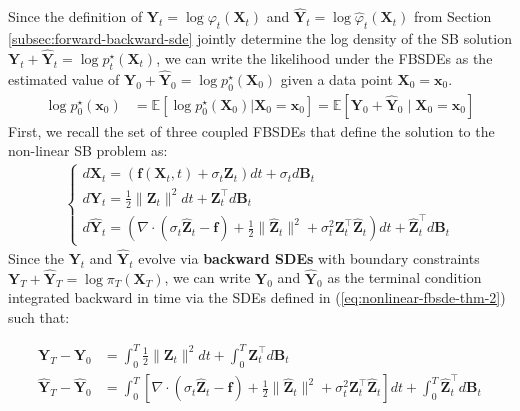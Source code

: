 \documentclass{article}
\begin{document}
Since the definition of $\boldsymbol{Y}_t=\log \varphi_t(\boldsymbol{X}_t)$ and $\widehat{\boldsymbol{Y}}_t=\log \hat{\varphi}_t(\boldsymbol{X}_t)$ from Section \ref{subsec:forward-backward-sde} jointly determine the log density of the SB solution $\boldsymbol{Y}_t+\widehat{\boldsymbol{Y}}_t=\log p^\star_t(\boldsymbol{X}_t)$, we can write the likelihood under the FBSDEs as the estimated value of $\boldsymbol{Y}_0+\widehat{\boldsymbol{Y}}_0=\log p_0^\star(\boldsymbol{X}_0)$ given a data point $\boldsymbol{X}_0=\boldsymbol{x}_0$.
\begin{align}
    \log p^\star_0(\boldsymbol{x}_0)&=\mathbb{E}\left[\log p_0^\star(\boldsymbol{X}_0)|\boldsymbol{X}_0=\boldsymbol{x}_0\right]=\mathbb{E}\left[\boldsymbol{Y}_0+\widehat{\boldsymbol{Y}}_0\;\big|\;\boldsymbol{X}_0=\boldsymbol{x}_0\right]
\end{align}
First, we recall the set of three coupled FBSDEs that define the solution to the non-linear SB problem as: 
\begin{align}
\begin{cases}
    d\boldsymbol{X}_t=\left(\boldsymbol{f}(\boldsymbol{X}_t,t)+ \sigma_t \boldsymbol{Z}_t\right)dt+\sigma_t d\boldsymbol{B}_t\\
    d\boldsymbol{Y}_t=\frac{1}{2}\|\boldsymbol{Z}_t\|^2dt+\boldsymbol{Z}_t^\top d \boldsymbol{B}_t\\
    d\widehat{\boldsymbol{Y}}_t=\left(\nabla\cdot (\sigma_t\widehat{\boldsymbol{Z}}_t-\boldsymbol{f})+\frac{1}{2}\|\widehat{\boldsymbol{Z}}_t\|^2+ \sigma_t^2\boldsymbol{Z}_t^\top \widehat{\boldsymbol{Z}}_t\right)dt+\widehat{\boldsymbol{Z}}_t^\top d \boldsymbol{B}_t
\end{cases}
\end{align}
Since the $\boldsymbol{Y}_t$ and $\widehat{\boldsymbol{Y}}_t$ evolve via \textbf{backward SDEs} with boundary constraints $\boldsymbol{Y}_T+\widehat{\boldsymbol{Y}}_T=\log \pi_T(\boldsymbol{X}_T)$, we can write $\boldsymbol{Y}_0$ and $\widehat{\boldsymbol{Y}}_0$ as the terminal condition integrated backward in time via the SDEs defined in (\ref{eq:nonlinear-fbsde-thm-2}) such that:
\begin{small}
\begin{align}
    \boldsymbol{Y}_T-\boldsymbol{Y}_0&=\int_0^T \frac{1}{2}\|\boldsymbol{Z}_t\|^2dt+\int_0^T\boldsymbol{Z}_t^\top d \boldsymbol{B}_t\label{eq:likelihood-derivation-1}\\
    \widehat{\boldsymbol{Y}}_T-\widehat{\boldsymbol{Y}}_0&=\int_0^T\left[\nabla\cdot (\sigma_t\widehat{\boldsymbol{Z}}_t-\boldsymbol{f})+\frac{1}{2}\|\widehat{\boldsymbol{Z}}_t\|^2+ \sigma_t^2\boldsymbol{Z}_t^\top \widehat{\boldsymbol{Z}}_t\right]dt+\int_0^T\widehat{\boldsymbol{Z}}_t^\top d \boldsymbol{B}_t
\end{align}
\end{small}
\end{document}
